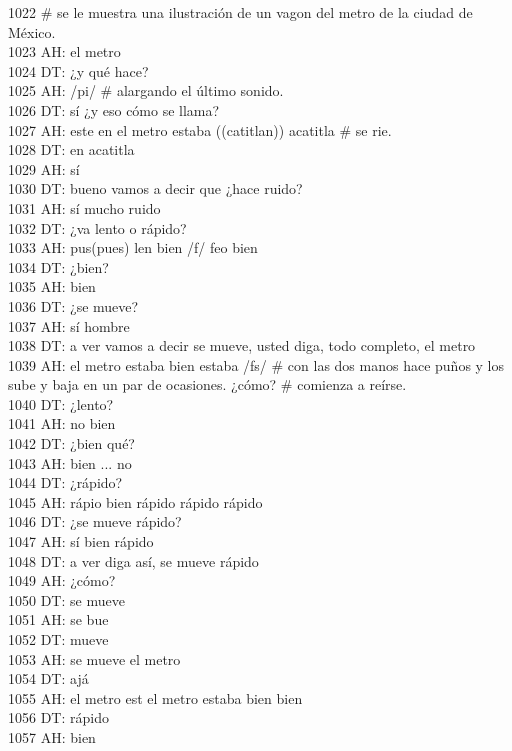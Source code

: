 1022 # se le muestra una ilustración de un vagon del metro de la ciudad de México.\\
1023 AH: el metro\\
1024 DT: ¿y qué hace?\\
1025 AH: /pi/ # alargando el último sonido.\\
1026 DT: sí ¿y eso cómo se llama?\\
1027 AH: este en el metro estaba ((catitlan)) acatitla # se rie.\\
1028 DT: en acatitla\\
1029 AH: sí\\
1030 DT: bueno vamos a decir que ¿hace ruido?\\
1031 AH: sí mucho ruido\\
1032 DT: ¿va lento o rápido?\\
1033 AH: pus(pues) len bien /f/ feo bien \\
1034 DT: ¿bien?\\
1035 AH: bien\\
1036 DT: ¿se mueve?\\
1037 AH: sí hombre\\
1038 DT: a ver vamos a decir se mueve, usted diga, todo completo, el metro\\
1039 AH: el metro estaba bien estaba /fs/ # con las dos manos hace puños y los sube y baja en un par de ocasiones. ¿cómo? # comienza a reírse.\\
1040 DT: ¿lento?\\
1041 AH: no bien\\
1042 DT: ¿bien qué?\\
1043 AH: bien ... no\\
1044 DT: ¿rápido?\\
1045 AH: rápio bien rápido rápido rápido\\
1046 DT: ¿se mueve rápido?\\
1047 AH: sí bien rápido\\
1048 DT: a ver diga así, se mueve rápido\\
1049 AH: ¿cómo?\\
1050 DT: se mueve\\
1051 AH: se bue\\
1052 DT: mueve\\
1053 AH: se mueve el metro\\
1054 DT: ajá\\
1055 AH: el metro est el metro estaba bien bien \\
1056 DT: rápido\\
1057 AH: bien\\
